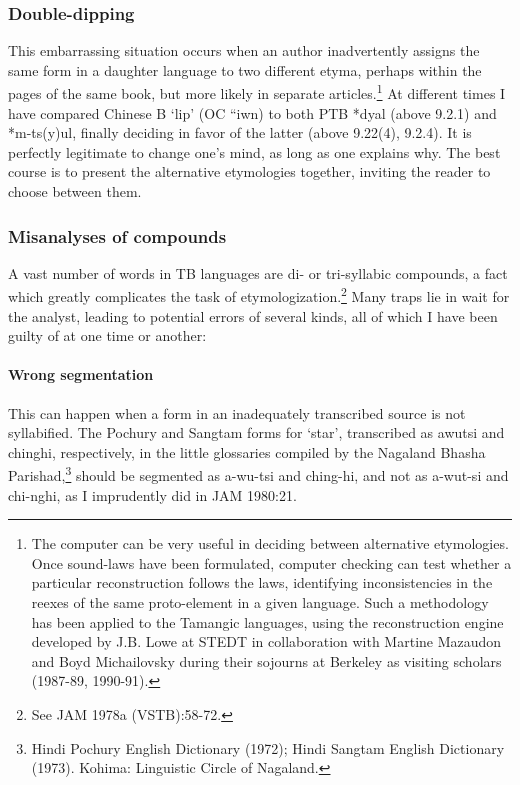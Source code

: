 \documentclass[10pt]{article}
\begin{document}
\subsubsection{Double-dipping}
This embarrassing situation occurs when an author inadvertently assigns the same form in a daughter language to two different etyma, perhaps within the pages of the same book, but more likely in separate articles.\footnote{The computer can be very useful in deciding between alternative etymologies. Once  sound-laws  have been formulated, computer checking can test whether a particular reconstruction follows the laws, identifying inconsistencies in the re\xdf exes of the same proto-element in a given language. Such a methodology has been applied to the Tamangic languages, using the  reconstruction engine  developed by J.B. Lowe at STEDT in collaboration with Martine Mazaudon and Boyd Michailovsky during their sojourns at Berkeley as visiting scholars (1987-89, 1990-91).} At different times I have compared Chinese \xae B `lip' (OC  ``iw\xfa n) to both PTB *dyal (above 9.2.1) and *m-ts(y)ul, finally deciding in favor of the latter (above 9.22(4), 9.2.4). It is perfectly legitimate to change one's mind, as long as one explains why. The best course is to present the alternative etymologies together, inviting the reader to choose between them.

\subsubsection{Misanalyses of compounds}
A vast number of words in TB languages are di- or tri-syllabic compounds, a fact which greatly complicates the task of etymologization.\footnote{See JAM 1978a (VSTB):58-72.} Many traps lie in wait for the analyst, leading to potential errors of several kinds, all of which I have been guilty of at one time or another:

\paragraph{Wrong segmentation}
This can happen when a form in an inadequately transcribed source is not syllabified. The Pochury and Sangtam forms for `star', transcribed as awutsi and chinghi, respectively, in the little glossaries compiled by the Nagaland Bhasha Parishad,\footnote{Hindi Pochury English Dictionary (1972); Hindi Sangtam English Dictionary (1973). Kohima: Linguistic Circle of Nagaland.} should be segmented as a-wu-tsi and ching-hi, and not as a-wut-si and chi-nghi, as I imprudently did in JAM 1980:21.
\end{document}

